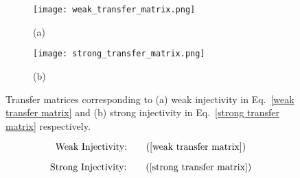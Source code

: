 \documentclass[12pt]{article}
\begin{document}
\begin{figure}[h]
    \centering
    \begin{subfigure}[b]{0.45\textwidth}
        \centering
        \caption{(a)}
        \label{fig:weak_transfer_matrix}
        \texttt{[image: weak\_transfer\_matrix.png]}
    \end{subfigure}
    \qquad
    \begin{subfigure}[b]{0.45\textwidth}
        \centering
        \caption{(b)}
        \label{fig:strong_transfer_matrix}
        \texttt{[image: strong\_transfer\_matrix.png]}
    \end{subfigure}
    \caption{Transfer matrices corresponding to (a) weak injectivity in Eq.~\eqref{weak transfer matrix} and (b) strong injectivity in Eq.~\eqref{strong transfer matrix} respectively.}
    \label{fig:transfer_matrices}
\end{figure}

\begin{equation}
    \text{Weak Injectivity:}
    \tag{\ref{weak transfer matrix}}
\end{equation}

\begin{equation}
    \text{Strong Injectivity:}
    \tag{\ref{strong transfer matrix}}
\end{equation}
\end{document}

